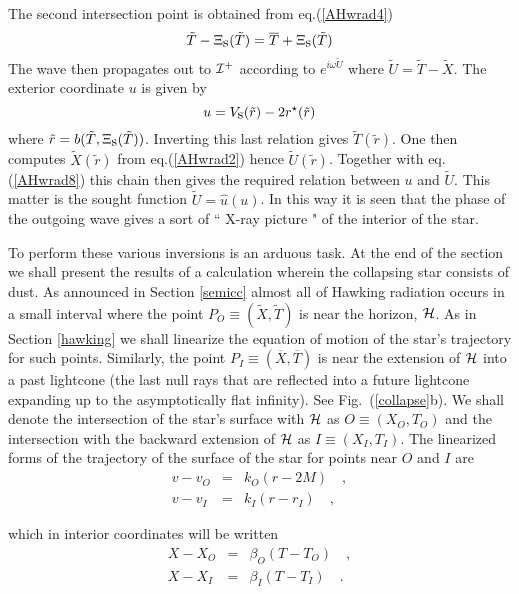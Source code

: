 \documentclass[12pt,oneside]{report}
\def\beq {\begin{equation}}
\def\feq {\end{equation}}
\begin{document}
{\noindent The second intersection point is obtained from eq.(\ref{AHwrad4})
\beq {\tilde T} - \Xi_{\mbox{\rm s}} ({\tilde T}) = {\overline T} +
\Xi_{\mbox{\rm s}} ({\tilde T}) \label{AHwrad7} \feq
\noindent The wave then propagates out to $ {\cal I}^+$
according to $ e^{i \omega {\tilde U} }$ where $ {\tilde U} =
{\tilde T} - {\tilde X}$. The exterior coordinate $u$ is given
by
\beq u = V_{\mbox{\rm s}} ({\tilde r}) - 2 r^{\star} ({\tilde r}) \label{AHwrad8} \feq
\noindent where $ {\tilde r} = b ({\tilde T}, \Xi_{\mbox{\rm s}} ({\tilde
T}))$. Inverting this last relation gives $ {\tilde T}
({\tilde r})$. One then computes $ {\tilde X}({\tilde r})$
from eq.(\ref{AHwrad2}) hence $ {\tilde U}({\tilde r})$. Together with eq.(\ref{AHwrad8})
this chain then gives the required relation between $u$ and ${\tilde U}$.
This matter is the sought function ${\tilde U}= {\hat u} (u)$. In this
way it is seen that the phase of the outgoing wave gives a
sort of `` X-ray picture " of the interior of the star.


To perform these various inversions is an arduous task. At the
end of the section we shall present  the results of a calculation
wherein the collapsing star consists of dust. As announced in Section
\ref{semicc}  almost all of Hawking radiation occurs in
a small interval where the point $P_O \equiv ({\tilde X}, {\tilde T}) $ is
near the horizon, ${\cal H}$. As in Section \ref{hawking} we shall
linearize the equation of motion of the star's trajectory for
such points. Similarly, the point $P_I \equiv  ({\overline X}, {\overline
T}) $ is near the extension of ${\cal H}$ into a past lightcone (the
last null rays that are reflected into a future lightcone expanding up to the
asymptotically flat infinity). See Fig.~(\ref{collapse}b). We shall denote the
intersection of the star's surface with ${\cal H}$ as $O\equiv (X_O, T_O) $ and
the intersection with the backward extension of ${\cal H}$ as $I\equiv(X_I, T_I)$.
 The linearized forms of the trajectory of the surface of the star for points
near $O$ and $I$ are
\begin{eqnarray}
v - v_O &=& k_O (r - 2 M) \quad ,\nonumber \\
v - v_I &=& k_I (r - r_I) \quad ,  \label{AHwrad9}
\end{eqnarray}

\noindent which in interior coordinates  will be written
\begin{eqnarray}
X - X_O &=& \beta_O (T - T_O)\quad ,  \nonumber \\
X - X_I &=& \beta_I (T - T_I) \quad . \label{AHwrad10}
\end{eqnarray} 


}
\end{document}
